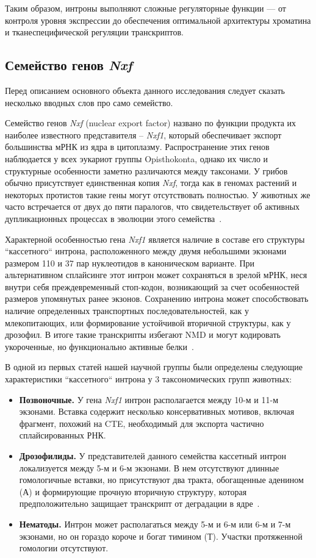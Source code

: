 Таким образом, интроны выполняют сложные регуляторные функции — от контроля уровня экспрессии до обеспечения оптимальной архитектуры хроматина и тканеспецифической регуляции транскриптов.


\subsection{Семейство генов \textit{Nxf}}

Перед описанием основного объекта данного исследования следует сказать нес\-колько вводных слов про само семейство.

Семейство генов \textit{Nxf} (nuclear export factor) названо по функции продукта их наиболее известного представителя – \textit{Nxf1}, который обеспечивает экспорт большинства мРНК из ядра в цитоплазму.
Распространение этих генов наблюдается у всех эукариот группы Opisthokonta, однако их число и структурные особенности заметно различаются между таксонами.
У грибов обычно присутствует единственная копия \textit{Nxf}, тогда как в геномах растений и некоторых протистов такие гены могут отсутствовать полностью.
У животных же часто встречается от двух до пяти паралогов, что свидетельствует об активных дупликационных процессах в эволюции этого семейства~\cite{Mamon2013}.

Характерной особенностью гена \textit{Nxf1} является наличие в составе его структуры ``кассетного`` интрона, расположенного между двумя небольшими экзонами размером 110 и 37 пар нуклеотидов в каноническом варианте.
При альтернативном сплайсинге этот интрон может сохраняться в зрелой мРНК, неся внутри себя преждевременный стоп-кодон, возникающий за счет особенностей размеров упомянутых ранее экзонов.
Сохранению интрона может способствовать наличие определенных транспортных последовательностей, как у млекопитающих, или формирование устойчивой вторичной структуры, как у дрозофил.
В итоге такие транскрипты избегают NMD и могут кодировать укороченные, но функционально активные белки~\cite{Golubkova2012,Mamon2013}.

В одной из первых статей нашей научной группы были определены следующие характеристики ``кассетного`` интрона у 3 таксономических групп животных:

\begin{itemize}
  \item \textbf{Позвоночные.} У гена \textit{Nxf1} интрон располагается между 10-м и 11-м экзонами. Вставка содержит несколько консервативных мотивов, включая фрагмент, похожий на CTE, необходимый для экспорта частично сплайсированных РНК.
  \item \textbf{Дрозофилиды.} У представителей данного семейства кассетный интрон локализуется между 5-м и 6-м экзонами. В нем отсутствуют длинные гомологичные вставки, но присутствуют два тракта, обогащенные аденином (А) и формирующие прочную вторичную структуру, которая предположительно защищает транскрипт от деградации в ядре~\cite{Mamon2013}.
  \item \textbf{Нематоды.} Интрон может располагаться между 5-м и 6-м или 6-м и 7-м экзонами, но он гораздо короче и богат тимином (Т). Участки протяженной гомологии отсутствуют.
\end{itemize}

